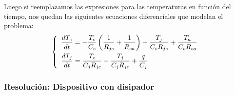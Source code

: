 \documentclass[10pt]{article}
\begin{document}
Luego si reemplazamos las expresiones para las temperaturas en función del tiempo, nos quedan las siguientes ecuaciones diferenciales que modelan el problema:
\begin{equation}
\medskip
\label{eq:diferenciales}
   \left\{
      \begin{array}{ll}
         \dfrac{dT_{c}}{dt}=-\dfrac{T_{c}}{C_{c}}\left(\dfrac{1}{R_{jc}}+\dfrac{1}{R_{ca}}\right)+\dfrac{T_{j}}{C_{c}R_{jc}}+\dfrac{T_{a}}{C_{c}R_{ca}}\\[10pt] %
         \dfrac{dT_{j}}{dt}=\dfrac{T_{c}}{C_{j}R_{jc}}-\dfrac{T_{j}}{C_{j}R_{jc}}+\dfrac{q}{C_{j}}
      \end{array}
   \right.
\end{equation}
\subsubsection{Resolución: Dispositivo con disipador}
\end{document}
